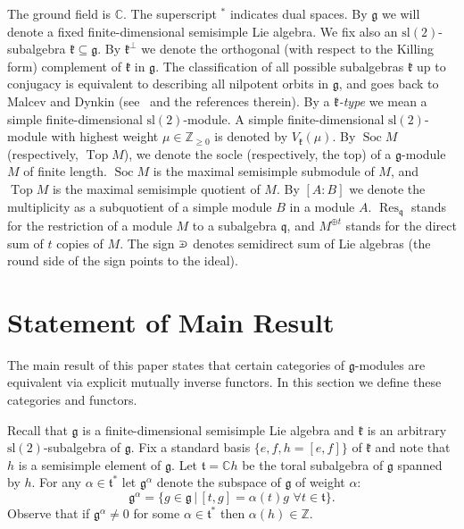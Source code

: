 \documentclass{tglat2e}
\theoremstyle{definition}
\theoremstyle{remark}
\renewcommand{\tt}{\mathfrak{t}}
\newcommand{\kk}{\mathfrak{k}}
\renewcommand{\gg}{\mathfrak{g}}
\DeclareMathOperator{\Soc}{Soc}
\DeclareMathOperator{\TopM}{Top}
\def\crplus{\hbox{$\supset${\raise1.15pt\hbox{\kern -0.55em ${\scriptscriptstyle +}$}}\ }}
\begin{document}
  The ground field is $\mathbb{C}$.  The superscript $^*$ indicates dual spaces.  By $\mathfrak{g}$ we will denote a fixed finite-dimensional semisimple Lie algebra.  We fix also an $\mathrm{sl}(2)$-subalgebra $\mathfrak{k}\subseteq\mathfrak{g}$.  By $\kk^\perp$ we denote the orthogonal (with respect to the Killing form) complement of $\kk$ in $\gg$.  The classification of all possible subalgebras $\mathfrak{k}$ up to conjugacy is equivalent to describing all nilpotent orbits in $\mathfrak{g}$, and goes back to Malcev and Dynkin (see~\cite{D} and the references therein).  By a \emph{$\mathfrak{k}$-type} we mean a simple finite-dimensional $\mathrm{sl}(2)$-module.  A simple finite-dimensional $\mathrm{sl}(2)$-module with highest weight $\mu\in\mathbb{Z}_{\geq0}$ is denoted by $V_\kk(\mu)$.  By $\Soc M$ (respectively, $\TopM M$), we denote the socle (respectively, the top) of a $\gg$-module $M$ of finite length.  $\Soc M$ is the maximal semisimple submodule of $M$, and $\TopM M$ is the maximal semisimple quotient of $M$. By $[A:B]$ we denote the multiplicity as a subquotient of a simple module $B$ in a module $A$. $\operatorname{Res}_{\mathfrak q}$ stands for the restriction of a module $M$ to a subalgebra $\mathfrak q$, and $M^{\oplus t}$ stands for the direct sum of $t$ copies of $M$.  The sign $\crplus$ denotes semidirect sum of Lie algebras (the round side of the sign points to the ideal).

\section{Statement of Main Result}
\label{sec:main}

The main result of this paper states that certain categories of
$\mathfrak{g}$-modules are equivalent via explicit mutually inverse
functors.  In this section we define these categories and functors.

Recall that $\mathfrak{g}$ is a finite-dimensional semisimple Lie algebra and $\mathfrak{k}$ is an arbitrary $\mathrm{sl}(2)$-subalgebra of $\mathfrak{g}$.  Fix a standard basis $\big\{e,f,h=[e,f]\big\}$ of $\mathfrak{k}$ and note that $h$ is a semisimple element of $\mathfrak{g}$.  Let $\mathfrak{t}=\mathbb{C}h$ be the toral subalgebra of $\mathfrak{g}$ spanned by $h$. For any $\alpha\in\mathfrak{t}^*$ let $\gg^\alpha$ denote the subspace  of $\gg$ of weight $\alpha$:
$$\gg^\alpha=\{g\in\gg\,|\,[t,g]=\alpha(t)g\,\,\forall t\in\tt\}.$$ Observe that if $\gg^\alpha\neq 0$ for some $\alpha\in\tt^*$ then $\alpha(h)\in\mathbb Z$.
 
\end{document}
